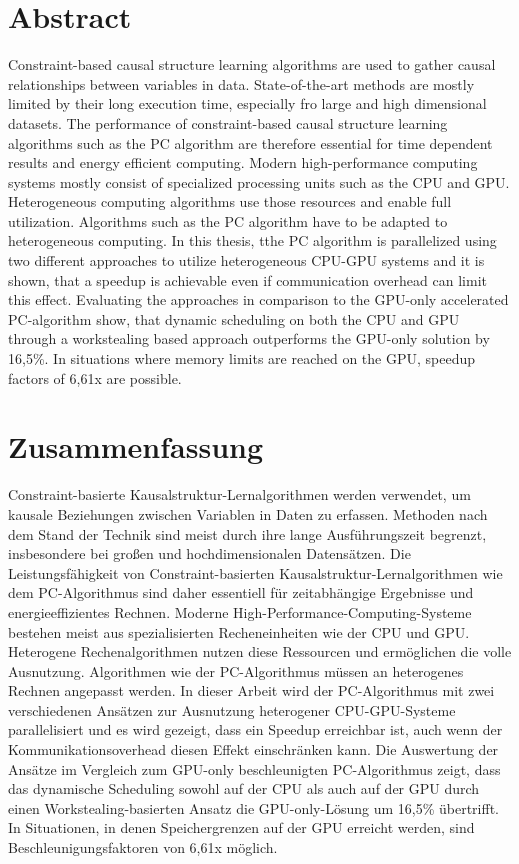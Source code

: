 \chapter*{Abstract}
Constraint-based causal structure learning algorithms are used to gather causal relationships between variables in data. State-of-the-art methods are mostly limited by their long execution time, especially fro large and high dimensional datasets. The performance of constraint-based causal structure learning algorithms such as the PC algorithm are therefore essential for time dependent results and energy efficient computing. Modern high-performance computing systems mostly consist of specialized processing units such as the CPU and GPU. Heterogeneous computing algorithms use those resources and enable full utilization. Algorithms such as the PC algorithm have to be adapted to heterogeneous computing. In this thesis, tthe PC algorithm is parallelized using two different approaches to utilize heterogeneous CPU-GPU systems and it is shown, that a speedup is achievable even if communication overhead can limit this effect. Evaluating the approaches in comparison to the GPU-only accelerated PC-algorithm show, that dynamic scheduling on both the CPU and GPU through a workstealing based approach outperforms the GPU-only solution by 16,5\%. In situations where memory limits are reached on the GPU, speedup factors of 6,61x are possible.

\chapter*{Zusammenfassung}
Constraint-basierte Kausalstruktur-Lernalgorithmen werden verwendet, um kausale Beziehungen zwischen Variablen in Daten zu erfassen. Methoden nach dem Stand der Technik sind meist durch ihre lange Ausführungszeit begrenzt, insbesondere bei großen und hochdimensionalen Datensätzen. Die Leistungsfähigkeit von Constraint-basierten Kausalstruktur-Lernalgorithmen wie dem PC-Algorithmus sind daher essentiell für zeitabhängige Ergebnisse und energieeffizientes Rechnen. Moderne High-Performance-Computing-Systeme bestehen meist aus spezialisierten Recheneinheiten wie der CPU und GPU. Heterogene Rechenalgorithmen nutzen diese Ressourcen und ermöglichen die volle Ausnutzung. Algorithmen wie der PC-Algorithmus müssen an heterogenes Rechnen angepasst werden. In dieser Arbeit wird der PC-Algorithmus mit zwei verschiedenen Ansätzen zur Ausnutzung heterogener CPU-GPU-Systeme parallelisiert und es wird gezeigt, dass ein Speedup erreichbar ist, auch wenn der Kommunikationsoverhead diesen Effekt einschränken kann. Die Auswertung der Ansätze im Vergleich zum GPU-only beschleunigten PC-Algorithmus zeigt, dass das dynamische Scheduling sowohl auf der CPU als auch auf der GPU durch einen Workstealing-basierten Ansatz die GPU-only-Lösung um 16,5\% übertrifft. In Situationen, in denen Speichergrenzen auf der GPU erreicht werden, sind Beschleunigungsfaktoren von 6,61x möglich.

